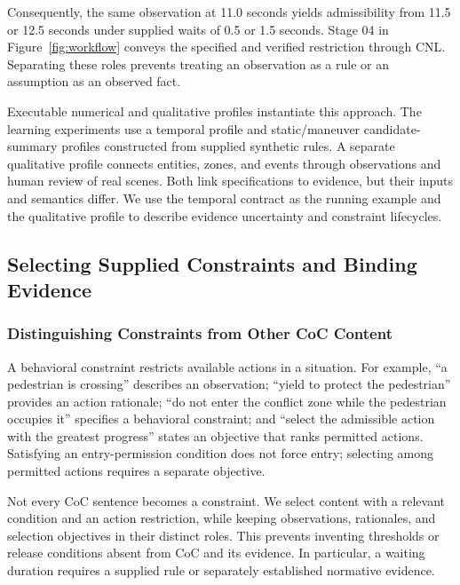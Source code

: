 \documentclass[nolineno]{ieeeaccess}
\begin{document}
Consequently, the same observation at 11.0 seconds yields admissibility from 11.5 or 12.5 seconds under supplied waits of 0.5 or 1.5 seconds. Stage 04 in Figure~\ref{fig:workflow} conveys the specified and verified restriction through CNL. Separating these roles prevents treating an observation as a rule or an assumption as an observed fact.\par

Executable numerical and qualitative profiles instantiate this approach. The learning experiments use a temporal profile and static/maneuver candidate-summary profiles constructed from supplied synthetic rules. A separate qualitative profile connects entities, zones, and events through observations and human review of real scenes. Both link specifications to evidence, but their inputs and semantics differ. We use the temporal contract as the running example and the qualitative profile to describe evidence uncertainty and constraint lifecycles.\par

\subsection{Selecting Supplied Constraints and Binding Evidence}\label{sec:extraction}

\subsubsection{Distinguishing Constraints from Other CoC Content}

A behavioral constraint restricts available actions in a situation. For example, “a pedestrian is crossing” describes an observation; “yield to protect the pedestrian” provides an action rationale; “do not enter the conflict zone while the pedestrian occupies it” specifies a behavioral constraint; and “select the admissible action with the greatest progress” states an objective that ranks permitted actions. Satisfying an entry-permission condition does not force entry; selecting among permitted actions requires a separate objective.\par

Not every CoC sentence becomes a constraint. We select content with a relevant condition and an action restriction, while keeping observations, rationales, and selection objectives in their distinct roles. This prevents inventing thresholds or release conditions absent from CoC and its evidence. In particular, a waiting duration requires a supplied rule or separately established normative evidence.\par
\end{document}

